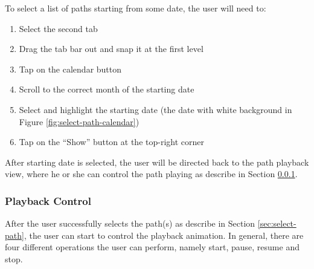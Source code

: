 \documentclass[12pt,a4paper]{article}
\begin{document}
                To select a list of paths starting from some date, the user will need to:
                \begin{enumerate}
                    \item Select the second tab
                    \item Drag the tab bar out and snap it at the first level
                    \item Tap on the calendar button
                    \item Scroll to the correct month of the starting date
                    \item Select and highlight the starting date (the date with white background in Figure \ref{fig:select-path-calendar})
                    \item Tap on the ``Show'' button at the top-right corner
                \end{enumerate}
                
                After starting date is selected, the user will be directed back to the path playback view, where he or she can control the path playing as describe in Section \ref{sec:playback-control}.
                
            \subsubsection{Playback Control}
                \label{sec:playback-control}
                
                After the user successfully selects the path(s) as describe in Section \ref{sec:select-path}, the user can start to control the playback animation. In general, there are four different operations the user can perform, namely start, pause, resume and stop.
                
\end{document}
